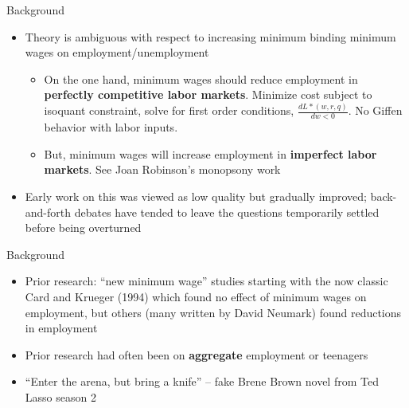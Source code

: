 \documentclass{beamer}
\begin{document}
\begin{frame}{Background}

\begin{itemize}
\item Theory is ambiguous with respect to increasing minimum binding minimum wages on employment/unemployment 
	\begin{itemize}
	\item On the one hand, minimum wages should reduce employment in \textbf{perfectly competitive labor markets}. Minimize cost subject to isoquant constraint, solve for first order conditions, $\frac{d L*(w,r,q)}{d w<0}$. No Giffen behavior with labor inputs.
	\item But, minimum wages will increase employment in \textbf{imperfect labor markets}. See Joan Robinson's monopsony work 
	\end{itemize}
\item Early work on this was viewed as low quality but gradually improved; back-and-forth debates have tended to leave the questions temporarily settled before being overturned
\end{itemize}
\end{frame}

\begin{frame}{Background}

\begin{itemize}
\item Prior research: ``new minimum wage'' studies starting with the now classic Card and Krueger (1994) which found no effect of minimum wages on employment, but others (many written by David Neumark) found reductions in employment
\item Prior research had often been on \textbf{aggregate} employment or teenagers
\item ``Enter the arena, but bring a knife'' -- fake Brene Brown novel from Ted Lasso season 2
\end{itemize}

\end{frame}
\end{document}
